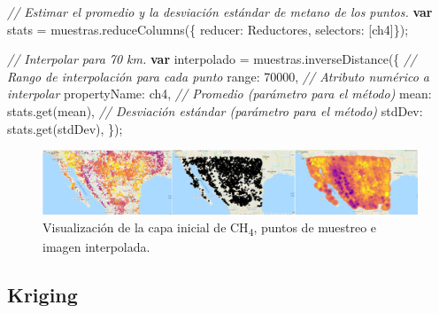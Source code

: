 \documentclass[
  12pt,
  letterpaper,
  twoside]{book}
\newenvironment{Shaded}{\begin{snugshade}}{\end{snugshade}}
\newcommand{\CommentTok}[1]{\textcolor[rgb]{0.24,0.58,0.00}{\textit{#1}}}
\newcommand{\DataTypeTok}[1]{\textcolor[rgb]{0.00,0.00,0.00}{#1}}
\newcommand{\DecValTok}[1]{\textcolor[rgb]{0.28,0.53,0.93}{#1}}
\newcommand{\FunctionTok}[1]{\textcolor[rgb]{0.48,0.12,0.64}{#1}}
\newcommand{\KeywordTok}[1]{\textcolor[rgb]{0.00,0.00,0.00}{\textbf{#1}}}
\newcommand{\NormalTok}[1]{#1}
\newcommand{\OperatorTok}[1]{\textcolor[rgb]{0.00,0.00,0.00}{#1}}
\newcommand{\StringTok}[1]{\textcolor[rgb]{0.87,0.29,0.22}{#1}}
\begin{document}
\begin{Shaded}
\begin{Highlighting}[]
\CommentTok{// Estimar el promedio y la desviación estándar de metano de los puntos.}
\KeywordTok{var}\NormalTok{ stats }\OperatorTok{=}\NormalTok{ muestras}\OperatorTok{.}\FunctionTok{reduceColumns}\NormalTok{(\{}
  \DataTypeTok{reducer}\OperatorTok{:}\NormalTok{ Reductores}\OperatorTok{,}
  \DataTypeTok{selectors}\OperatorTok{:}\NormalTok{ [}\StringTok{\textquotesingle{}ch4\textquotesingle{}}\NormalTok{]\})}\OperatorTok{;}

\CommentTok{// Interpolar para 70 km.}
\KeywordTok{var}\NormalTok{ interpolado }\OperatorTok{=}\NormalTok{ muestras}\OperatorTok{.}\FunctionTok{inverseDistance}\NormalTok{(\{}
  \CommentTok{// Rango de interpolación para cada punto}
  \DataTypeTok{range}\OperatorTok{:} \DecValTok{70000}\OperatorTok{,} 
  \CommentTok{// Atributo numérico a interpolar}
  \DataTypeTok{propertyName}\OperatorTok{:} \StringTok{\textquotesingle{}ch4\textquotesingle{}}\OperatorTok{,} 
  \CommentTok{// Promedio (parámetro para el método)}
  \DataTypeTok{mean}\OperatorTok{:}\NormalTok{ stats}\OperatorTok{.}\FunctionTok{get}\NormalTok{(}\StringTok{\textquotesingle{}mean\textquotesingle{}}\NormalTok{)}\OperatorTok{,} 
  \CommentTok{// Desviación estándar (parámetro para el método)}
  \DataTypeTok{stdDev}\OperatorTok{:}\NormalTok{ stats}\OperatorTok{.}\FunctionTok{get}\NormalTok{(}\StringTok{\textquotesingle{}stdDev\textquotesingle{}}\NormalTok{)}\OperatorTok{,} 
\NormalTok{  \})}\OperatorTok{;} 
\end{Highlighting}
\end{Shaded}



\begin{figure}[H]

{\centering \includegraphics[width=0.95\linewidth]{Img/interpol} 

}

\caption{Visualización de la capa inicial de CH\textsubscript{4}, puntos de muestreo e imagen interpolada.}\label{fig:fc113}
\end{figure}

\hypertarget{kriging}{%
\subsection*{Kriging}\label{kriging}}
\end{document}
